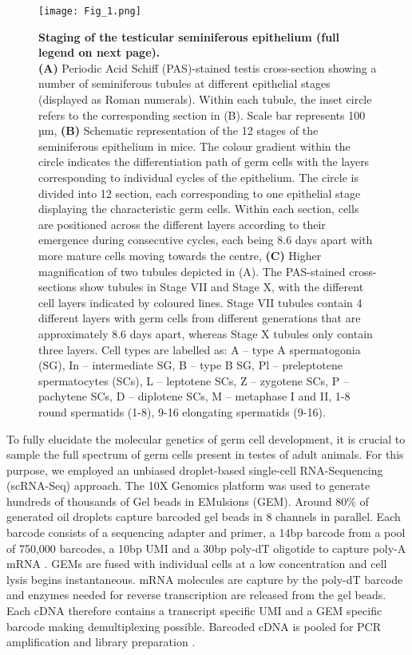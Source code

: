 \newpage

\begin{figure}[!h]
\centering
\texttt{[image: Fig\_1.png]}
\caption[Staging of the testicular seminiferous epithelium]{\textbf{Staging of the testicular seminiferous epithelium (full legend on next page).}\\
\textbf{(A)} Periodic Acid Schiff (PAS)-stained testis cross-section showing a number of seminiferous tubules at different epithelial stages (displayed as Roman numerals). Within each tubule, the inset circle refers to the corresponding section in (B). Scale bar represents 100 µm, \textbf{(B)} Schematic representation of the 12 stages of the seminiferous epithelium in mice. The colour gradient within the circle indicates the differentiation path of germ cells with the layers corresponding to individual cycles of the epithelium. The circle is divided into 12 section, each corresponding to one epithelial stage displaying the characteristic germ cells. Within each section, cells are positioned across the different layers according to their emergence during consecutive cycles, each being 8.6 days apart with more mature cells moving towards the centre, \textbf{(C)} Higher magnification of two tubules depicted in (A). The PAS-stained cross-sections show tubules in Stage VII and Stage X, with the different cell layers indicated by coloured lines. Stage VII tubules contain 4 different layers with germ cells from different generations that are approximately 8.6 days apart, whereas Stage X tubules only contain three layers. Cell types are labelled as: A – type A spermatogonia (SG), In – intermediate SG, B – type B SG, Pl – preleptotene spermatocytes (SCs), L – leptotene SCs, Z – zygotene SCs, P – pachytene SCs, D – diplotene SCs, M – metaphase I and II, 1-8 round spermatids (1-8), 9-16 elongating spermatids (9-16).}
\label{fig3:cell_staging}
\end{figure}

\newpage

To fully elucidate the molecular genetics of germ cell development, it is crucial to sample the full spectrum of germ cells present in testes of adult animals. For this purpose, we employed an unbiased droplet-based single-cell RNA-Sequencing (scRNA-Seq) approach. The 10X Genomics\texttrademark{} platform was used to generate hundreds of thousands of Gel beads in EMulsions (GEM). Around 80\% of generated oil droplets capture barcoded gel beads in 8 channels in parallel. Each barcode consists of a sequencing adapter and primer, a 14bp barcode from a pool of 750,000 barcodes, a 10bp UMI and a 30bp poly-dT oligotide to capture poly-A mRNA \citep{Zheng2017}. GEMs are fused with individual cells at a low concentration and cell lysis begins instantaneous. mRNA molecules are capture by the poly-dT barcode and enzymes needed for reverse transcription are released from the gel beads. Each cDNA therefore contains a transcript specific UMI and a GEM specific barcode making demultiplexing possible. Barcoded cDNA is pooled for PCR amplification and library preparation \citep{Zheng2017}. \\

